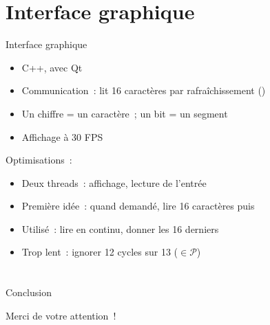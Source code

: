 \documentclass[11pt]{beamer}
\begin{document}
\section{Interface graphique}

\begin{frame}{Interface graphique}
\begin{itemize}
\item C++, avec Qt
\item Communication~: lit 16 caractères par rafraîchissement ()
\item Un chiffre = un caractère~; un bit = un segment
\item Affichage à 30 FPS
\end{itemize}

\noindent Optimisations~:
\begin{itemize}
\item \alert{Deux threads}~: affichage, lecture de l'entrée
\item Première idée~: quand demandé, lire 16 caractères puis 
\item Utilisé~: lire en continu, donner les 16 derniers
\item Trop lent~: ignorer \alert{12 cycles sur 13} ($\in \mathcal{P}$)
\end{itemize}
\end{frame}

\section*{}

\begin{frame}{Conclusion}
\begin{center}\Huge
Merci de votre attention~!
\end{center}
\end{frame}
\end{document}

